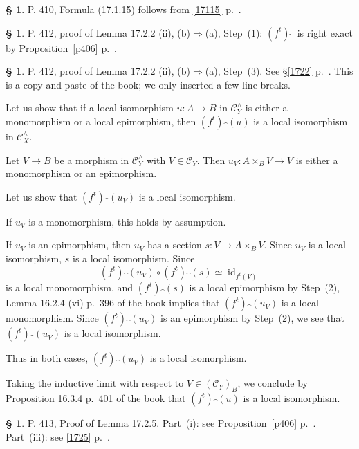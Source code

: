 \documentclass[12pt]{article}%
\theoremstyle{remark}
\theoremstyle{definition}
\newtheorem{s}[thm]{\S}%
\newcommand{\C}{\mathcal C}
\newcommand{\then}{\Rightarrow}
\DeclareMathOperator{\id}{id}
\begin{document}
\begin{s}\label{17115b}
P. 410, Formula (17.1.15) follows from \eqref{17115} p.~\pageref{17115}.
\end{s}

%

\begin{s}
P. 412, proof of Lemma 17.2.2 (ii), (b)$\then$(a), Step~(1): $(f^t)\,\widehat{}\ $ is right exact by Proposition~\ref{p406} p.~\pageref{p406}.
\end{s}

%

\begin{s}
P. 412, proof of Lemma 17.2.2 (ii), (b)$\then$(a), Step~(3). See \S\ref{1722} p.~\pageref{1722}. This is a copy and paste of the book; we only inserted a few line breaks.

Let us show that if a local isomorphism $u:A\to B$ in $\C_Y^\wedge$ is either a monomorphism or a local epimorphism, then $(f^t)\widehat{\ \,}(u)$ is a local isomorphism in $\C_X^\wedge$. 

Let $V\to B$ be a morphism in $\C_Y^\wedge$ with $V\in\C_Y$. Then $u_V: A\times_BV\to V$ is either a monomorphism or an epimorphism. 

Let us show that $(f^t)\widehat{\ \,}(u_V)$ is a local isomorphism. 

If $u_V$ is a monomorphism, this holds by assumption. 

If $u_V$ is an epimorphism, then $u_V$ has a section $s:V\to A\times_BV$. Since $u_V$ is a local isomorphism, $s$ is a local isomorphism. Since 
$$
(f^t)\widehat{\ \,}(u_V)\circ(f^t)\widehat{\ \,}(s)\simeq\id_{f^t(V)}
$$ 
is a local monomorphism, and $(f^t)\widehat{\ \,}(s)$ is a local epimorphism by Step~(2), Lemma 16.2.4 (vi) p.~396 of the book implies that $(f^t)\widehat{\ \,}(u_V)$ is a local monomorphism. Since $(f^t)\widehat{\ \,}(u_V)$ is an epimorphism by Step~(2), we see that $(f^t)\widehat{\ \,}(u_V)$ is a local isomorphism. 

Thus in both cases, $(f^t)\widehat{\ \,}(u_V)$ is a local isomorphism. 

Taking the inductive limit with respect to $V\in(\C_Y)_B$, we conclude by Proposition 16.3.4 p.~401 of the book that $(f^t)\widehat{\ \,}(u)$ is a local isomorphism. 
\end{s}

%

\begin{s}\label{1725b}
P. 413, Proof of Lemma 17.2.5. Part~(i): see Proposition~\ref{p406} p.~\pageref{p406}. Part~(iii): see \eqref{1725} p.~\pageref{1725}.
\end{s}
\end{document}

